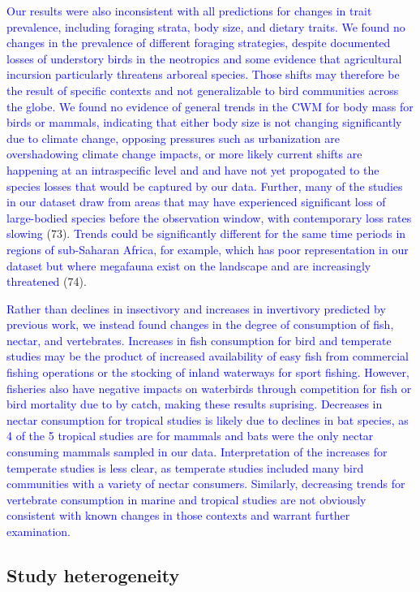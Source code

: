 \documentclass{article}
\begin{document}
\textcolor{blue}{Our results were also inconsistent with all predictions for changes in trait prevalence, including foraging strata, body size, and dietary traits. We found no changes in the prevalence of different foraging strategies, despite documented losses of understory birds in the neotropics and some evidence that agricultural incursion particularly threatens arboreal species. Those shifts may therefore be the result of specific contexts and not generalizable to bird communities across the globe. We found no evidence of general trends in the CWM for body mass for birds or mammals, indicating that either body size is not changing significantly due to climate change, opposing pressures such as urbanization are overshadowing climate change impacts, or more likely current shifts are happening at an intraspecific level and and have not yet propogated to the species losses that would be captured by our data. Further, many of the studies in our dataset draw from areas that may have experienced significant loss of large-bodied species before the observation window, with contemporary loss rates slowing}
(73).
\textcolor{blue}{Trends could be significantly different for the same time periods in regions of sub-Saharan Africa, for example, which has poor representation in our dataset but where megafauna exist on the landscape and are increasingly threatened}
(74).

\textcolor{blue}{Rather than declines in insectivory and increases in invertivory predicted by previous work, we instead found changes in the degree of consumption of fish, nectar, and vertebrates. Increases in fish consumption for bird and temperate studies may be the product of increased availability of easy fish from commercial fishing operations or the stocking of inland waterways for sport fishing. However, fisheries also have negative impacts on waterbirds through competition for fish or bird mortality due to by catch, making these results suprising. Decreases in nectar consumption for tropical studies is likely due to declines in bat species, as 4 of the 5 tropical studies are for mammals and bats were the only nectar consuming mammals sampled in our data. Interpretation of the increases for temperate studies is less clear, as temperate studies included many bird communities with a variety of nectar consumers. Similarly, decreasing trends for vertebrate consumption in marine and tropical studies are not obviously consistent with known changes in those contexts and warrant further examination.}

\hypertarget{study-heterogeneity}{%
\subsection{Study heterogeneity}\label{study-heterogeneity}}
\end{document}
